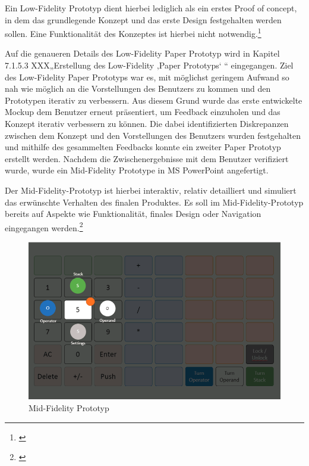 
Ein Low-Fidelity Prototyp dient hierbei lediglich als ein erstes Proof of concept, in dem das grundlegende Konzept und das erste Design festgehalten werden sollen. Eine Funktionalität des Konzeptes ist hierbei nicht notwendig.\footnote{\cite[vgl.][S.~204]{jhammondtgrossjwesson2002}}

Auf die genaueren Details des Low-Fidelity Paper Prototyp wird in Kapitel 7.1.5.3 XXX„Erstellung des Low-Fidelity ‚Paper Prototyps‘ “ eingegangen. Ziel des Low-Fidelity Paper Prototyps war es, mit möglichst geringem Aufwand so nah wie möglich an die Vorstellungen des Benutzers zu kommen und den Prototypen iterativ zu verbessern. Aus diesem Grund wurde das erste entwickelte Mockup dem Benutzer erneut präsentiert, um Feedback einzuholen und das Konzept iterativ verbessern zu können. Die dabei identifizierten Diskrepanzen zwischen dem Konzept und den Vorstellungen des Benutzers wurden festgehalten und mithilfe des gesammelten Feedbacks konnte ein zweiter Paper Prototyp erstellt werden. Nachdem die Zwischenergebnisse mit dem Benutzer verifiziert wurde, wurde ein Mid-Fidelity Prototype in MS PowerPoint angefertigt.

Der Mid-Fidelity-Prototyp ist hierbei interaktiv, relativ detailliert und simuliert das erwünschte Verhalten des finalen Produktes. Es soll im Mid-Fidelity-Prototyp bereits auf Aspekte wie Funktionalität, finales Design oder Navigation eingegangen werden.\footnote{\cite[vgl.][S.~204]{jhammondtgrossjwesson2002}}


\begin{figure}[!h]
	\includegraphics[width=1\columnwidth]{img/planung-mid-fidelity}
	\caption[Mid-Fidelity Prototyp]{Mid-Fidelity Prototyp\footnotemark}
\end{figure}

